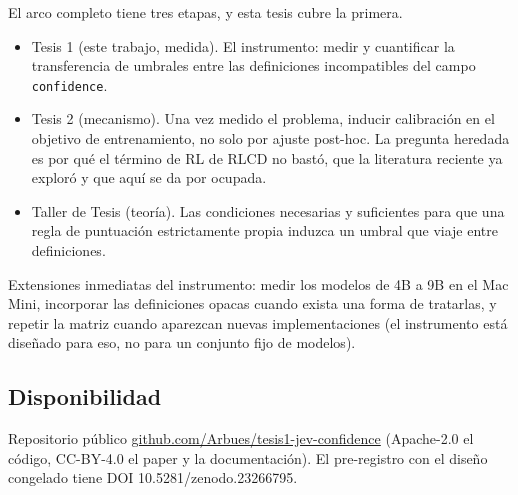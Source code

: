 El arco completo tiene tres etapas, y esta tesis cubre la primera.

\begin{itemize}
\item Tesis 1 (este trabajo, medida). El instrumento: medir y cuantificar la transferencia de umbrales entre las definiciones incompatibles del campo \texttt{confidence}.
\item Tesis 2 (mecanismo). Una vez medido el problema, inducir calibración en el objetivo de entrenamiento, no solo por ajuste post-hoc. La pregunta heredada es por qué el término de RL de RLCD no bastó, que la literatura reciente ya exploró y que aquí se da por ocupada.
\item Taller de Tesis (teoría). Las condiciones necesarias y suficientes para que una regla de puntuación estrictamente propia induzca un umbral que viaje entre definiciones.
\end{itemize}

Extensiones inmediatas del instrumento: medir los modelos de 4B a 9B en el Mac Mini, incorporar las definiciones opacas cuando exista una forma de tratarlas, y repetir la matriz cuando aparezcan nuevas implementaciones (el instrumento está diseñado para eso, no para un conjunto fijo de modelos).

\subsection{Disponibilidad}

Repositorio público \url{github.com/Arbues/tesis1-jev-confidence} (Apache-2.0 el código, CC-BY-4.0 el paper y la documentación). El pre-registro con el diseño congelado tiene DOI 10.5281/zenodo.23266795.

